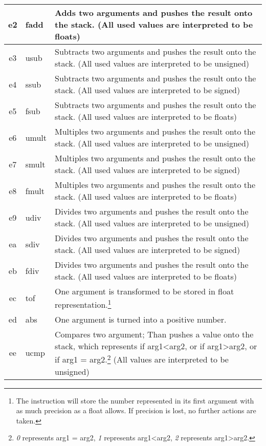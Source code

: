 \documentclass[10pt,a4paper]{article}
\begin{document}
\begin{longtable}[c]{c|l|p{9cm}}
		\hline		
		\hex e2 & fadd & Adds two arguments and pushes the result onto the stack. (All used values are interpreted to be floats) \\
		\hline		
		\hex e3 & usub & Subtracts two arguments and pushes the result onto the stack. (All used values are interpreted to be unsigned) \\
		\hline		
		\hex e4 & ssub & Subtracts two arguments and pushes the result onto the stack. (All used values are interpreted to be signed) \\		
		\hline
		\hex e5 & fsub & Subtracts two arguments and pushes the result onto the stack. (All used values are interpreted to be floats) \\		
		\hline
		\hex e6 & umult & Multiples two arguments and pushes the result onto the stack. (All used values are interpreted to be unsigned) \\	
		\hline
		\hex e7 & smult & Multiples two arguments and pushes the result onto the stack. (All used values are interpreted to be signed) \\	
		\hline
		\hex e8 & fmult & Multiples two arguments and pushes the result onto the stack. (All used values are interpreted to be floats) \\
		\hline
		\hex e9 & udiv & Divides two arguments and pushes the result onto the stack. (All used values are interpreted to be unsigned) \\	
		\hline
		\hex ea & sdiv & Divides two arguments and pushes the result onto the stack. (All used values are interpreted to be signed) \\	
		\hline
		\hex eb & fdiv & Divides two arguments and pushes the result onto the stack. (All used values are interpreted to be floats) \\
		\hline
		\hex ec & tof & One argument is transformed to be stored in float representation.\footnote{The instruction will store the number represented in its first argument with as much precision as a float allows. If precision is lost, no further actions are taken.} \\
		\hline
		\hex ed & abs & One argument is turned into a positive number. \\
		\hline
		\hex ee & ucmp & Compares two argument; Than pushes a value onto the stack, which represents if arg1\textless arg2, or if arg1\textgreater arg2, or if arg1 = arg2.\footnote{\label{cmp_footnote} \textit{0} represents arg1 = arg2, \textit{1} represents arg1\textless arg2, \textit{2} represents arg1\textgreater arg2.} (All values are interpreted to be unsigned) \\

\end{longtable}
\end{document}
